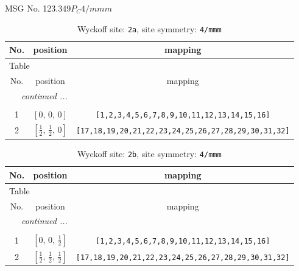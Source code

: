 \documentclass[fleqn,8pt]{jsarticle}
\begin{document}
\setcounter{MaxMatrixCols}{32}

\renewcommand{\tablename}{Table~}
\renewcommand{\figurename}{Figure~}
\begin{center}
\LARGE
MSG No. 123.349\quad$P_{C}4/mmm$
\end{center}
\renewcommand{\arraystretch}{1.2}
\begin{longtable}{ccc}
\caption{Wyckoff site: {\tt 2a}, site symmetry: {\tt 4/mmm}}
 \\
 \hline \hline
No. & position & mapping \\ \hline \endfirsthead

\multicolumn{2}{l}{\tablename\ \thetable{}} \\
 \hline \hline
No. & position & mapping \\ \hline \endhead

 \hline \hline
\multicolumn{2}{r}{\footnotesize\it continued ...} \\ \endfoot

 \hline \hline
\multicolumn{2}{r}{} \\ \endlastfoot

1 & $\left[ 0,\, 0,\, 0 \right]$ & {\tt [1,2,3,4,5,6,7,8,9,10,11,12,13,14,15,16]} \\ \hline
2 & $\left[ \frac{1}{2},\, \frac{1}{2},\, 0 \right]$ & {\tt [17,18,19,20,21,22,23,24,25,26,27,28,29,30,31,32]} \\
\end{longtable}
\renewcommand{\arraystretch}{1.2}
\begin{longtable}{ccc}
\caption{Wyckoff site: {\tt 2b}, site symmetry: {\tt 4/mmm}}
 \\
 \hline \hline
No. & position & mapping \\ \hline \endfirsthead

\multicolumn{2}{l}{\tablename\ \thetable{}} \\
 \hline \hline
No. & position & mapping \\ \hline \endhead

 \hline \hline
\multicolumn{2}{r}{\footnotesize\it continued ...} \\ \endfoot

 \hline \hline
\multicolumn{2}{r}{} \\ \endlastfoot

1 & $\left[ 0,\, 0,\, \frac{1}{2} \right]$ & {\tt [1,2,3,4,5,6,7,8,9,10,11,12,13,14,15,16]} \\ \hline
2 & $\left[ \frac{1}{2},\, \frac{1}{2},\, \frac{1}{2} \right]$ & {\tt [17,18,19,20,21,22,23,24,25,26,27,28,29,30,31,32]} \\
\end{longtable}
\end{document}
